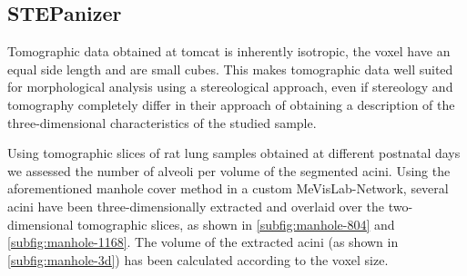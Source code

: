 
\subsection{STEPanizer}
Tomographic data obtained at \ac{tomcat} is inherently isotropic, \ie the voxel have an equal side length and are small cubes. This makes tomographic data well suited for morphological analysis using a stereological approach, even if stereology and tomography completely differ in their approach of obtaining a description of the three-dimensional characteristics of the studied sample.

Using tomographic slices of rat lung samples obtained at different postnatal days we assessed the number of alveoli per volume of the segmented acini. Using the aforementioned manhole cover method in a custom MeVisLab-Network, several acini have been three-dimensionally extracted and overlaid over the two-dimensional tomographic slices, as shown in \autoref{subfig:manhole-804} and \ref{subfig:manhole-1168}. The volume of the extracted acini (as shown in \autoref{subfig:manhole-3d}) has been calculated according to the voxel size.

